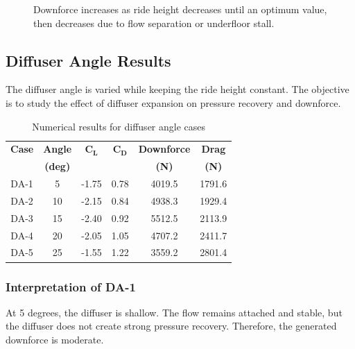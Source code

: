 \documentclass[12pt,a4paper]{article}
\begin{document}
\begin{figure}[H]
\centering
{}
\caption{Downforce increases as ride height decreases until an optimum value, then decreases due to flow separation or underfloor stall.}
\end{figure}

\subsection{Diffuser Angle Results}

The diffuser angle is varied while keeping the ride height constant. The objective is to study the effect of diffuser expansion on pressure recovery and downforce.

\begin{table}[H]
\centering
\caption{Numerical results for diffuser angle cases}
\begin{tabular}{cccccc}
\toprule
\textbf{Case} & \textbf{Angle} & \(\bm{C_L}\) & \(\bm{C_D}\) & \textbf{Downforce} & \textbf{Drag} \\
 & \textbf{(deg)} & & & \textbf{(N)} & \textbf{(N)} \\
\midrule
DA-1 & 5  & -1.75 & 0.78 & 4019.5 & 1791.6 \\
DA-2 & 10 & -2.15 & 0.84 & 4938.3 & 1929.4 \\
DA-3 & 15 & -2.40 & 0.92 & 5512.5 & 2113.9 \\
DA-4 & 20 & -2.05 & 1.05 & 4707.2 & 2411.7 \\
DA-5 & 25 & -1.55 & 1.22 & 3559.2 & 2801.4 \\
\bottomrule
\end{tabular}
\end{table}

\subsubsection{Interpretation of DA-1}

At 5 degrees, the diffuser is shallow. The flow remains attached and stable, but the diffuser does not create strong pressure recovery. Therefore, the generated downforce is moderate.
\end{document}
